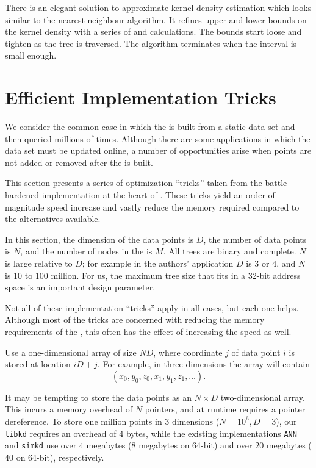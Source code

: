 There is an elegant solution to approximate kernel density estimation
which looks similar to the nearest-neighbour algorithm.  It refines
upper and lower bounds on the kernel density with a series of
\mindist and
\maxdist calculations.  The bounds start loose and tighten as the tree is
traversed.  The algorithm terminates when the interval is small
enough.


\section{Efficient Implementation Tricks}
\label{sec:impl}

We consider the common case in which the \kdtree is built from a
static data set and then queried millions of times.  Although there
are some applications in which the data set must be updated online, a
number of opportunities arise when points are not added or removed
after the \kdtree is built.


This section presents a series of optimization ``tricks'' taken from
the battle-hardened \kdtree implementation at the heart of \an.
These tricks yield an order of magnitude speed increase and vastly
reduce the memory required compared to the alternatives available.


In this section, the dimension of the data points is $D$, the number
of data points is $N$, and the number of nodes in the \kdtree is $M$.
All trees are binary and complete. $N$ is large relative to $D$; for
example in the authors' application $D$ is 3 or 4, and $N$ is 10 to
100 million.  For us, the maximum tree size that fits in a 32-bit
address space is an important design parameter.

Not all of these implementation ``tricks'' apply in all cases, but each one
helps.  Although most of the tricks are concerned with reducing the memory
requirements of the \kdtree, this often has the effect of increasing the
speed as well.


\label{trick:flatarray}
Use a one-dimensional array of size $ND$, where coordinate $j$ of data
point $i$ is stored 
at location $iD + j$.  For example, in three dimensions
the array will contain
\[ (x_0, y_0, z_0, x_1, y_1, z_1, \ldots) .\]

It may be tempting to store the data points as an $N \times D$
two-dimensional array.  This incurs a memory overhead of $N$ pointers,
and at runtime requires a pointer dereference.  To store one million
points in 3 dimensions ($N=10^{6}, D=3$), our {\tt libkd} requires an
overhead of 4 bytes, while the existing implementations {\tt ANN} and
{\tt simkd} use over $4$ megabytes ($8$ megabytes on 64-bit) and over
$20$ megabytes ($40$ on 64-bit), respectively.

